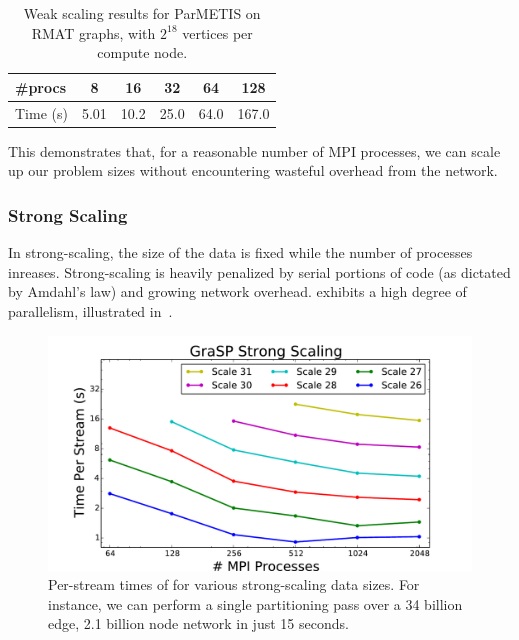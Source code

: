 \begin{table}
\caption{Weak scaling results for ParMETIS on RMAT graphs, with $2^{18}$ vertices per compute node.}
\centering
\small
{ \begin{tabular}{ l | c | c | c | c | c }    \toprule
\#procs & 8 & 16 & 32 & 64 & 128 \\ \midrule
Time (s) & 5.01 & 10.2 & 25.0 & 64.0 & 167.0 \\
\hline
\end{tabular}\par
}
\label{tab:rmatpmweak}
\end{table}

This demonstrates that, for a reasonable number of MPI processes, we can scale up our problem sizes without encountering wasteful overhead from the network.

\subsubsection{Strong Scaling}
In strong-scaling, the size of the data is fixed while the number of processes inreases. 
Strong-scaling is heavily penalized by serial portions of code (as dictated by Amdahl's law) and growing network overhead. \ourmethod exhibits a high degree of parallelism, illustrated in~. 

\begin{figure}[b!]
\centering
  \includegraphics[width=0.9\columnwidth]{figures/strong_scaling.pdf}
  \caption{Per-stream times of \ourmethod for various strong-scaling data sizes. For instance, we can perform a single partitioning pass over a 34 billion edge, 2.1 billion node network in just 15 seconds.}
  \label{fig:kronspeed_strong}
\end{figure}


